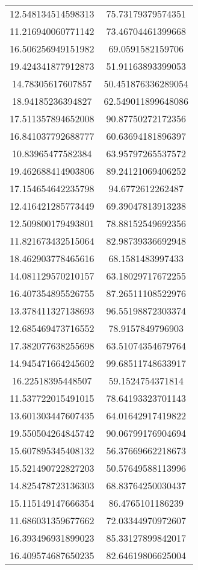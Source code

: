 \begin{table}
\begin{tabular}{cc}
12.548134514598313 & 75.73179379574351 \\
11.216940060771142 & 73.46704461399668 \\
16.506256949151982 & 69.0591582159706 \\
19.424341877912873 & 51.91163893399053 \\
14.78305617607857 & 50.451876336289054 \\
18.94185236394827 & 62.549011899648086 \\
17.511357894652008 & 90.87750272172356 \\
16.841037792688777 & 60.63694181896397 \\
10.83965477582384 & 63.95797265537572 \\
19.462688414903806 & 89.24121069406252 \\
17.154654642235798 & 94.6772612262487 \\
12.416421285773449 & 69.39047813913238 \\
12.509800179493801 & 78.88152549692356 \\
11.821673432515064 & 82.98739336692948 \\
18.462903778465616 & 68.1581483997433 \\
14.081129570210157 & 63.18029717672255 \\
16.407354895526755 & 87.26511108522976 \\
13.378411327138693 & 96.55198872303374 \\
12.685469473716552 & 78.9157849796903 \\
17.382077638255698 & 63.51074354679764 \\
14.945471664245602 & 99.68511748633917 \\
16.22518395448507 & 59.1524754371814 \\
11.537722015491015 & 78.64193323701143 \\
13.601303447607435 & 64.01642917419822 \\
19.550504264845742 & 90.06799176904694 \\
15.607895345408132 & 56.37669662218673 \\
15.521490722827203 & 50.57649588113996 \\
14.825478723136303 & 68.83764250030437 \\
15.115149147666354 & 86.4765101186239 \\
11.686031359677662 & 72.03344970972607 \\
16.393496931899023 & 85.33127899842017 \\
16.409574687650235 & 82.64619806625004 \\

\end{tabular}
\end{table}
